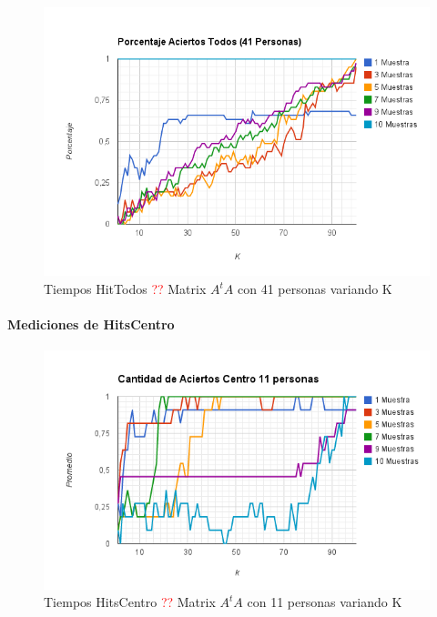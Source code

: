 \begin{figure}[H]
\includegraphics[width=1\textwidth]{img/image12.png}
     \caption{Tiempos HitTodos \textcolor{red}{??} Matrix $A^tA$ con 41 personas variando K}
     \label{fig:figura1}
\end{figure}





\paragraph{Mediciones de HitsCentro }

\begin{figure}[H]
\includegraphics[width=1\textwidth]{img/image13.png}
     \caption{Tiempos HitsCentro \textcolor{red}{??} Matrix $A^tA$ con 11 personas variando K}
     \label{fig:figura1}
\end{figure}

